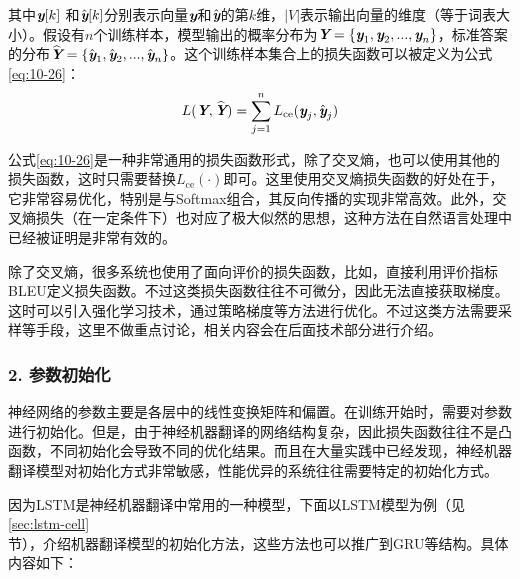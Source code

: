 \noindent 其中$\textbf{\em y}[k]$ 和$\hat{\textbf{\em y}}[k]$分别表示向量$\textbf{\em y}$和$\hat{\textbf{\em y}}$的第$k$维，$|V|$表示输出向量的维度（等于词表大小）。假设有$n$个训练样本，模型输出的概率分布为$\textbf{\em Y} = \{ \textbf{\em y}_1,\textbf{\em y}_2,..., \textbf{\em y}_n \}$，标准答案的分布$\widehat{\textbf{\em Y}}=\{ \hat{\textbf{\em y}}_1, \hat{\textbf{\em y}}_2,...,\hat{\textbf{\em y}}_n \}$。这个训练样本集合上的损失函数可以被定义为公式\eqref{eq:10-26}：
\begin{eqnarray}
L(\textbf{\em Y},\widehat{\textbf{\em Y}}) = \sum_{j=1}^n L_{\textrm{ce}}(\textbf{\em y}_j,\hat{\textbf{\em y}}_j)
\label{eq:10-26}
\end{eqnarray}

\parinterval 公式\eqref{eq:10-26}是一种非常通用的损失函数形式，除了交叉熵，也可以使用其他的损失函数，这时只需要替换$L_{\textrm{ce}} (\cdot)$即可。这里使用交叉熵损失函数的好处在于，它非常容易优化，特别是与Softmax组合，其反向传播的实现非常高效。此外，交叉熵损失（在一定条件下）也对应了极大似然的思想，这种方法在自然语言处理中已经被证明是非常有效的。

\parinterval 除了交叉熵，很多系统也使用了面向评价的损失函数，比如，直接利用评价指标BLEU定义损失函数。不过这类损失函数往往不可微分，因此无法直接获取梯度。这时可以引入强化学习技术，通过策略梯度等方法进行优化。不过这类方法需要采样等手段，这里不做重点讨论，相关内容会在后面技术部分进行介绍。


\subsubsection{2. 参数初始化}

\parinterval 神经网络的参数主要是各层中的线性变换矩阵和偏置。在训练开始时，需要对参数进行初始化。但是，由于神经机器翻译的网络结构复杂，因此损失函数往往不是凸函数，不同初始化会导致不同的优化结果。而且在大量实践中已经发现，神经机器翻译模型对初始化方式非常敏感，性能优异的系统往往需要特定的初始化方式。

\parinterval 因为LSTM是神经机器翻译中常用的一种模型，下面以LSTM模型为例（见\ref{sec:lstm-cell}\\ 节），介绍机器翻译模型的初始化方法，这些方法也可以推广到GRU等结构。具体内容如下：

